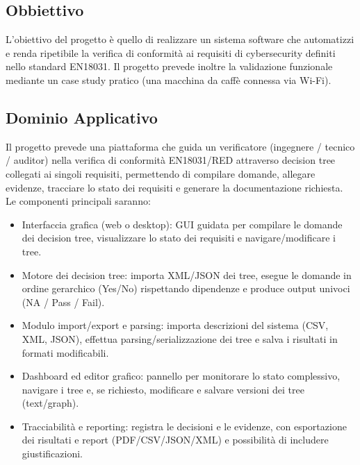 \documentclass[a4paper,12pt]{article}
\begin{document}
    \subsection{Obbiettivo}
    L’obiettivo del progetto è quello di realizzare un sistema software che automatizzi e renda ripetibile la verifica di conformità ai requisiti di cybersecurity definiti nello standard EN18031. Il progetto prevede inoltre la validazione funzionale mediante un case study pratico (una macchina da caffè connessa via Wi-Fi).
    \subsection{Dominio Applicativo}
    Il progetto prevede una piattaforma che guida un verificatore (ingegnere / tecnico / auditor) nella verifica di conformità EN18031/RED attraverso decision tree collegati ai singoli requisiti, permettendo di compilare domande, allegare evidenze, tracciare lo stato dei requisiti e generare la documentazione richiesta.\\
    Le componenti principali saranno:
    \begin{itemize}
        \item Interfaccia grafica (web o desktop): GUI guidata per compilare le domande dei decision tree, visualizzare lo stato dei requisiti e navigare/modificare i tree.
        \item Motore dei decision tree: importa XML/JSON dei tree, esegue le domande in ordine gerarchico (Yes/No) rispettando dipendenze e produce output univoci (NA / Pass / Fail).
        \item Modulo import/export e parsing: importa descrizioni del sistema (CSV, XML, JSON), effettua parsing/serializzazione dei tree e salva i risultati in formati modificabili.
        \item Dashboard ed editor grafico: pannello per monitorare lo stato complessivo, navigare i tree e, se richiesto, modificare e salvare versioni dei tree (text/graph).
        \item Tracciabilità e reporting: registra le decisioni e le evidenze, con esportazione dei risultati e report (PDF/CSV/JSON/XML) e possibilità di includere giustificazioni.
    \end{itemize}
\end{document}
